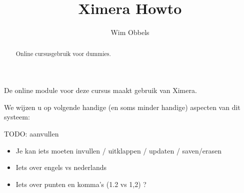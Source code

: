 \documentclass{ximera}
\author{Wim Obbels}
\title{Ximera Howto}
\begin{document}
\begin{abstract}
	Online cursusgebruik voor dummies.
\end{abstract}
\maketitle

De online module voor deze cursus maakt gebruik van Ximera.

We wijzen u op volgende handige (en soms minder handige) aspecten van dit systeem:


TODO: aanvullen


\begin{itemize}
	\item Je kan iets moeten invullen / uitklappen / updaten / saven/erasen

	\item Iets over engels vs nederlands

	\item Iets over punten en komma's  (1.2 vs 1,2) ?

\end{itemize}
\end{document}
